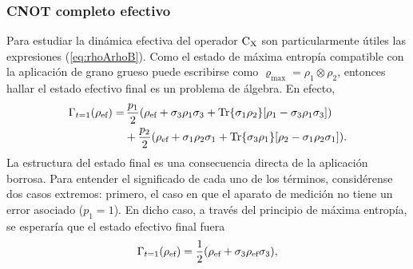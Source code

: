 \subsubsection{CNOT completo efectivo}

Para estudiar la dinámica efectiva del operador $\text{C}_{\text{X}}$ son particularmente útiles las expresiones (\ref{eq:rhoArhoB}). Como el estado de máxima entropía compatible con la aplicación de grano grueso puede escribirse como $\varrho_{\max}=\rho_{1}\otimes\rho_{2}$, entonces hallar el estado efectivo final es un problema de álgebra. En efecto,
\begin{align*}
    \Gamma_{t=1}(\rho_{\text{ef}})=&\,\frac{p_{1}}{2}(\rho_{\text{ef}}+\sigma_{3}\rho_{1}\sigma_{3}+\Tr{\sigma_{1}\rho_{2}}[\rho_{1}-\sigma_{3}\rho_{1}\sigma_{3}])\\
    &+\frac{p_{2}}{2}(\rho_{\text{ef}}+\sigma_{1}\rho_{2}\sigma_{1}+\Tr{\sigma_{3}\rho_{1}}[\rho_{2}-\sigma_{1}\rho_{2}\sigma_{1}]).
\end{align*}
La estructura del estado final es una consecuencia directa de la aplicación borrosa. Para entender el significado de cada uno de los términos, considérense dos casos extremos: primero, el caso en que el aparato de medición no tiene un error asociado ($p_{1}=1$). En dicho caso, a través del principio de máxima entropía, se esperaría que el estado efectivo final fuera
\begin{equation*}
  \Gamma_{t=1}(\rho_{\text{ef}})=\frac{1}{2}\qty(\rho_{\text{ef}}+\sigma_{3}\rho_{\text{ef}}\sigma_{3}),
\end{equation*}
